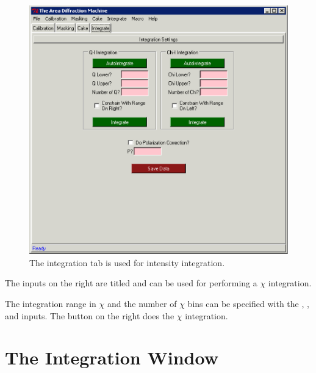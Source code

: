 \begin{figure}
    \centering
    \includegraphics[scale=.75]{figures/integration_tab.eps}
    \caption{The integration tab is used for intensity
    integration.}
    \label{integration_tab}
\end{figure}

The inputs on the right are titled 
and can be used for performing a $\chi$ integration.

The integration range in $\chi$ and the number of $\chi$ bins
can be specified with the , ,
and  inputs. 
The  button on the right does the $\chi$ integration.

\section{The Integration Window}

